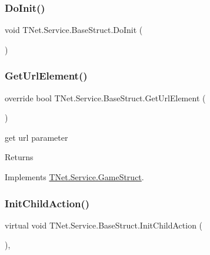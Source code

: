 \subsubsection{\texorpdfstring{Do\+Init()}{DoInit()}}
{\footnotesize\ttfamily void T\+Net.\+Service.\+Base\+Struct.\+Do\+Init (\begin{DoxyParamCaption}{ }\end{DoxyParamCaption})}





\mbox{\label{class_t_net_1_1_service_1_1_base_struct_a21e7b48b27540f2b155cd9aa0eb7fb10}} 
\subsubsection{\texorpdfstring{Get\+Url\+Element()}{GetUrlElement()}}
{\footnotesize\ttfamily override bool T\+Net.\+Service.\+Base\+Struct.\+Get\+Url\+Element (\begin{DoxyParamCaption}{ }\end{DoxyParamCaption})\hspace{0.3cm}{\ttfamily [virtual]}}



get url parameter 

\begin{DoxyReturn}{Returns}

\end{DoxyReturn}


Implements \mbox{\hyperlink{class_t_net_1_1_service_1_1_game_struct_ad4167cb7ce62183a1336ebc30a848bfc}{T\+Net.\+Service.\+Game\+Struct}}.

\mbox{\label{class_t_net_1_1_service_1_1_base_struct_ad2af7304687799ec4a7fe2036643d407}} 
\subsubsection{\texorpdfstring{Init\+Child\+Action()}{InitChildAction()}}
{\footnotesize\ttfamily virtual void T\+Net.\+Service.\+Base\+Struct.\+Init\+Child\+Action (\begin{DoxyParamCaption}{ }\end{DoxyParamCaption})\hspace{0.3cm}{\ttfamily [protected]}, {\ttfamily [virtual]}}



